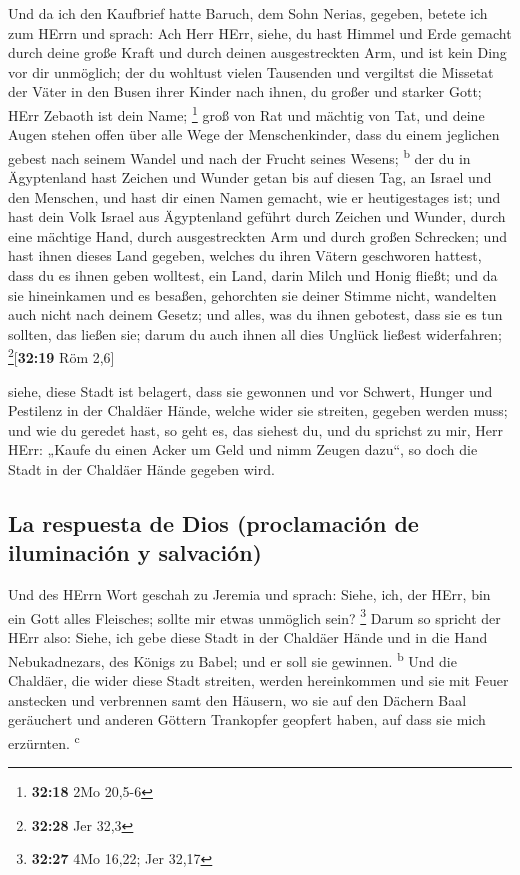  Und da ich den Kaufbrief hatte Baruch, dem Sohn Nerias,
gegeben, betete ich zum HErrn und sprach:  Ach Herr HErr,
siehe, du hast Himmel und Erde gemacht durch deine große Kraft und durch
deinen ausgestreckten Arm, und ist kein Ding vor dir unmöglich;
 der du wohltust vielen Tausenden und vergiltst die
Missetat der Väter in den Busen ihrer Kinder nach ihnen, du großer und
starker Gott; HErr Zebaoth ist dein Name; \footnote{\textbf{32:18} 2Mo
  20,5-6}  groß von Rat und mächtig von Tat, und deine
Augen stehen offen über alle Wege der Menschenkinder, dass du einem
jeglichen gebest nach seinem Wandel und nach der Frucht seines Wesens;
\textsuperscript{b}  der du in Ägyptenland hast Zeichen
und Wunder getan bis auf diesen Tag, an Israel und den Menschen, und
hast dir einen Namen gemacht, wie er heutigestages ist; 
und hast dein Volk Israel aus Ägyptenland geführt durch Zeichen und
Wunder, durch eine mächtige Hand, durch ausgestreckten Arm und durch
großen Schrecken;  und hast ihnen dieses Land gegeben,
welches du ihren Vätern geschworen hattest, dass du es ihnen geben
wolltest, ein Land, darin Milch und Honig fließt;  und da
sie hineinkamen und es besaßen, gehorchten sie deiner Stimme nicht,
wandelten auch nicht nach deinem Gesetz; und alles, was du ihnen
gebotest, dass sie es tun sollten, das ließen sie; darum du auch ihnen
all dies Unglück ließest widerfahren; \footnote{\textbf{32:28} Jer 32,3}{[}\textbf{32:19}
Röm 2,6{]}

 siehe, diese Stadt ist belagert, dass sie gewonnen und
vor Schwert, Hunger und Pestilenz in der Chaldäer Hände, welche wider
sie streiten, gegeben werden muss; und wie du geredet hast, so geht es,
das siehest du,  und du sprichst zu mir, Herr HErr:
„Kaufe du einen Acker um Geld und nimm Zeugen dazu``, so doch die Stadt
in der Chaldäer Hände gegeben wird.

\hypertarget{la-respuesta-de-dios-proclamaciuxf3n-de-iluminaciuxf3n-y-salvaciuxf3n}{%
\subsection{La respuesta de Dios (proclamación de iluminación y
salvación)}\label{la-respuesta-de-dios-proclamaciuxf3n-de-iluminaciuxf3n-y-salvaciuxf3n}}

 Und des HErrn Wort geschah zu Jeremia und sprach:
 Siehe, ich, der HErr, bin ein Gott alles Fleisches;
sollte mir etwas unmöglich sein? \footnote{\textbf{32:27} 4Mo 16,22; Jer
  32,17}  Darum so spricht der HErr also: Siehe, ich gebe
diese Stadt in der Chaldäer Hände und in die Hand Nebukadnezars, des
Königs zu Babel; und er soll sie gewinnen. \textsuperscript{b}
 Und die Chaldäer, die wider diese Stadt streiten, werden
hereinkommen und sie mit Feuer anstecken und verbrennen samt den
Häusern, wo sie auf den Dächern Baal geräuchert und anderen Göttern
Trankopfer geopfert haben, auf dass sie mich erzürnten.
\textsuperscript{c}

